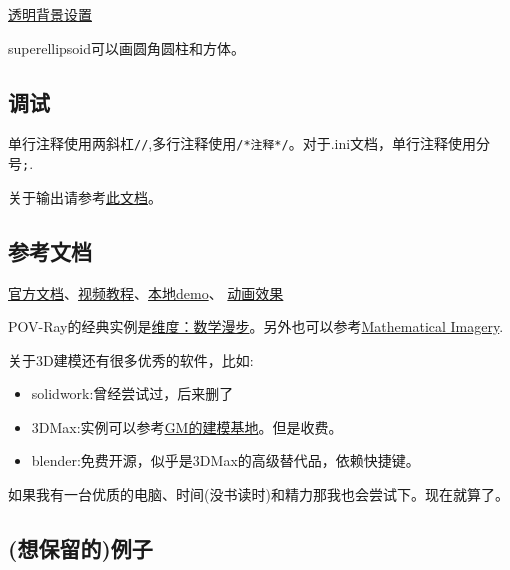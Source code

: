 \documentclass[11pt]{amsart}
\begin{document}
\href{http://www.imagico.de/pov/icons.php}{透明背景设置}

superellipsoid可以画圆角圆柱和方体。
\subsection{调试}
单行注释使用两斜杠\lstinline|//|,多行注释使用\lstinline|/*注释*/|。对于.ini文档，单行注释使用分号\lstinline|;|.

关于输出请参考\href{http://www.f-lohmueller.de/pov_tut/pov_inc/pov_300e.htm}{此文档}。
\subsection{参考文档}
\href{http://www.povray.org/documentation/3.7.0/t2_0.html}{官方文档}、\href{https://www.bilibili.com/video/BV1S4411e7AD}{视频教程}、\href{F://hide/POV/scenes/index.htm}{本地demo}、
\href{http://www.f-lohmueller.de/pov_tut/animate/anim001e.htm}{动画效果}

POV-Ray的经典实例是\href{http://www.dimensions-math.org/Dim_ZH_si.htm}{维度：数学漫步}。另外也可以参考\href{http://www.josleys.com/index.php}{Mathematical Imagery}.

关于3D建模还有很多优秀的软件，比如:
\begin{itemize}
\item solidwork:曾经尝试过，后来删了
\item 3DMax:实例可以参考\href{https://www.bilibili.com/video/BV1hy4y1k7k4}{GM的建模基地}。但是收费。
\item blender:免费开源，似乎是3DMax的高级替代品，依赖快捷键。
\end{itemize}
如果我有一台优质的电脑、时间(没书读时)和精力那我也会尝试下。现在就算了。
\subsection{(想保留的)例子}
\end{document}
